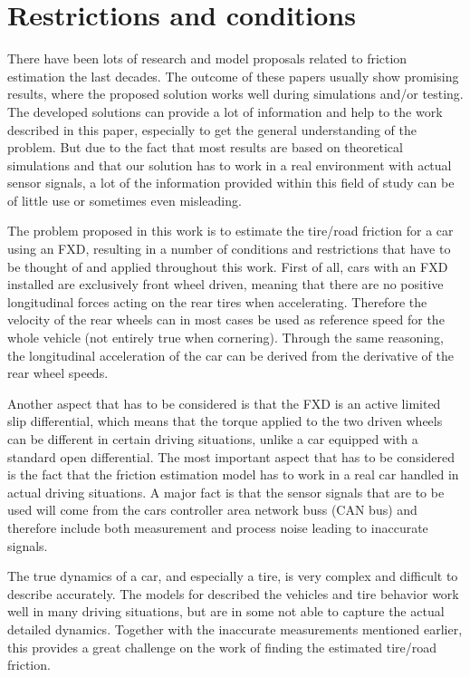 \section{Restrictions and conditions}
There have been lots of research and model proposals related to friction estimation the last decades. The outcome of these papers usually show promising results, where the proposed solution works well during simulations and/or testing. The developed solutions can provide a lot of information and help to the work described in this paper, especially to get the general understanding of the problem. But due to the fact that most results are based on theoretical simulations and that our solution has to work in a real environment with actual sensor signals, a lot of the information provided within this field of study can be of little use or sometimes even misleading.

The problem proposed in this work is to estimate the tire/road friction for a car using an FXD, resulting in a number of conditions and restrictions that have to be thought of and applied throughout this work. First of all, cars with an FXD installed are exclusively front wheel driven, meaning that there are no positive longitudinal forces acting on the rear tires when accelerating. Therefore the velocity of the rear wheels can in most cases be used as reference speed for the whole vehicle (not entirely true when cornering). Through the same reasoning, the longitudinal acceleration of the car can be derived from the derivative of the rear wheel speeds. 

Another aspect that has to be considered is that the FXD is an active limited slip differential, which means that the torque applied to the two driven wheels can be different in certain driving situations, unlike a car equipped with a standard open differential. The most important aspect that has to be considered is the fact that the friction estimation model has to work in a real car handled in actual driving situations. A major fact is that the sensor signals that are to be used  will come from the cars controller area network buss (CAN bus) and therefore include both measurement and process noise leading to inaccurate signals. 

The true dynamics of a car, and especially a tire, is very complex and difficult to describe accurately. The models for described the vehicles and tire behavior work well in many driving situations, but are in some not able to capture the actual detailed dynamics. Together with the inaccurate measurements mentioned earlier, this provides a great challenge on the work of finding the estimated tire/road friction. 

